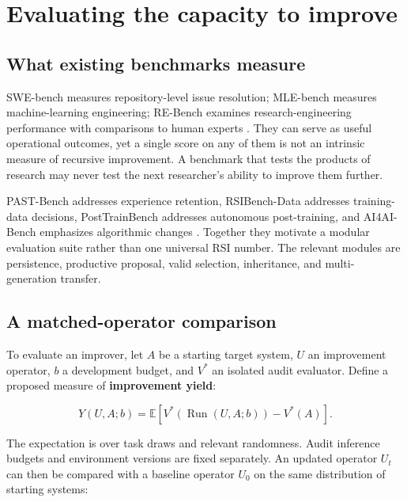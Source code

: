 \documentclass[11pt,american,]{article}
\begin{document}
\hypertarget{evaluating-the-capacity-to-improve}{%
\section{Evaluating the capacity to
improve}\label{evaluating-the-capacity-to-improve}}

\hypertarget{what-existing-benchmarks-measure}{%
\subsection{What existing benchmarks
measure}\label{what-existing-benchmarks-measure}}

SWE-bench measures repository-level issue resolution; MLE-bench measures
machine-learning engineering; RE-Bench examines research-engineering
performance with comparisons to human experts
\citep{swebench2023, mlebench2024, rebench2024}. They can serve as
useful operational outcomes, yet a single score on any of them is not an
intrinsic measure of recursive improvement. A benchmark that tests the
products of research may never test the next researcher's ability to
improve them further.

PAST-Bench addresses experience retention, RSIBench-Data addresses
training-data decisions, PostTrainBench addresses autonomous
post-training, and AI4AI-Bench emphasizes algorithmic changes
\citep{pastbench2026, rsidata2026, posttrain2026, ai4ai2026}. Together
they motivate a modular evaluation suite rather than one universal RSI
number. The relevant modules are persistence, productive proposal, valid
selection, inheritance, and multi-generation transfer.

\hypertarget{a-matched-operator-comparison}{%
\subsection{A matched-operator
comparison}\label{a-matched-operator-comparison}}

To evaluate an improver, let \(A\) be a starting target system, \(U\) an
improvement operator, \(b\) a development budget, and \(V^*\) an
isolated audit evaluator. Define a proposed measure of
\textbf{improvement yield}:

\[
Y(U,A;b)=\mathbb{E}\left[V^*(\operatorname{Run}(U,A;b))-V^*(A)\right].
\]

The expectation is over task draws and relevant randomness. Audit
inference budgets and environment versions are fixed separately. An
updated operator \(U_t\) can then be compared with a baseline operator
\(U_0\) on the same distribution of starting systems:
\end{document}
